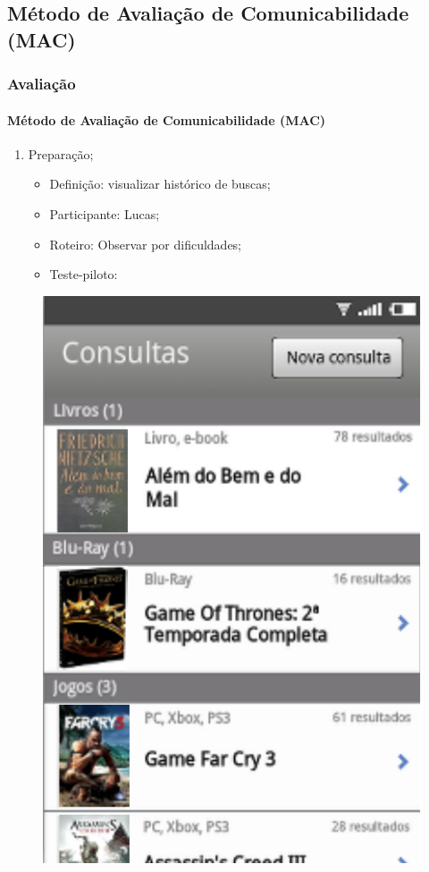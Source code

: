 \documentclass[14pt,beamer]{beamer}
\begin{document}
\subsection{Método de Avaliação de Comunicabilidade (MAC)}
\begin{frame}
	\frametitle{Avaliação}
	\framesubtitle{Método de Avaliação de Comunicabilidade (MAC)}

	\begin{enumerate}
        \item Preparação;
            \begin{itemize}
                \item Definição: visualizar histórico de buscas;
                \item Participante: Lucas;
                \item Roteiro: Observar por dificuldades;
                \item Teste-piloto: 
            \end{itemize}
	\end{enumerate}
    
    \begin{figure}
        \centering
        \includegraphics[scale=.45]{tela/TelaHistorico}
    \end{figure}
\end{frame}
\end{document}
